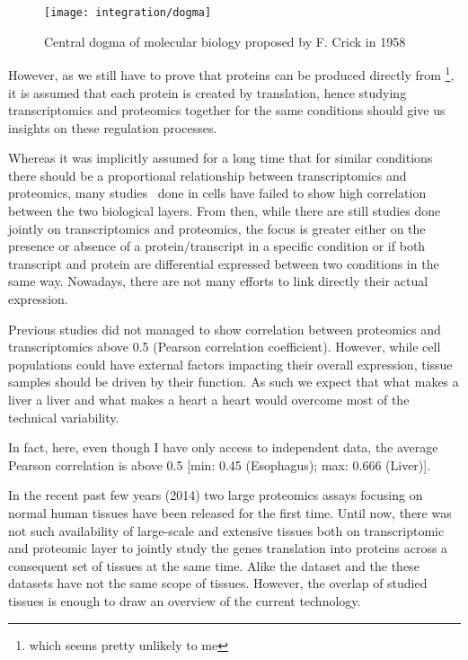 \begin{figure}
    \texttt{[image: integration/dogma]}\centering
    \caption{\label{dogma} Central dogma of molecular biology proposed by F. Crick in 1958}
\end{figure}

However, as we still have to prove that proteins can be produced directly
from \DNA \footnote{which seems pretty unlikely to me}, it is assumed that
each protein is created by translation, hence studying
transcriptomics and proteomics together for the same conditions should give us
insights on these regulation processes.

Whereas it was implicitly assumed for a long time that for similar conditions
there should be a proportional relationship between transcriptomics and proteomics,
many studies\
done in cells have failed to show high correlation between the two biological layers.
From then, while there are still studies done jointly on transcriptomics and
proteomics, the focus is greater either on the presence or absence of a
protein/transcript in a specific condition or if both transcript and protein
are differential expressed between two conditions in the same way.
Nowadays, there are not many efforts to link directly their actual expression.

Previous studies did not managed to show correlation between proteomics and
transcriptomics above 0.5 (Pearson correlation coefficient).
However, while cell populations could have external factors impacting their overall
expression, tissue samples should be driven by their function.
As such we expect that what makes a liver a liver and what makes a heart a heart
would overcome most of the technical variability.

In fact, here, even though I have only access to independent data,
the average Pearson correlation is above 0.5 [min: 0.45 (Esophagus); max: 0.666 (Liver)].


In the recent past few years (2014) two large proteomics assays focusing on normal
human tissues have been released for the first time.
Until now, there was not such availability of large-scale and extensive tissues
both on transcriptomic and proteomic layer to jointly study the genes
translation into proteins across a consequent set of tissues
at the same time. Alike the  dataset and the 
these datasets have not the same scope of tissues. However, the overlap of
studied tissues is enough to draw an overview of the current technology.


